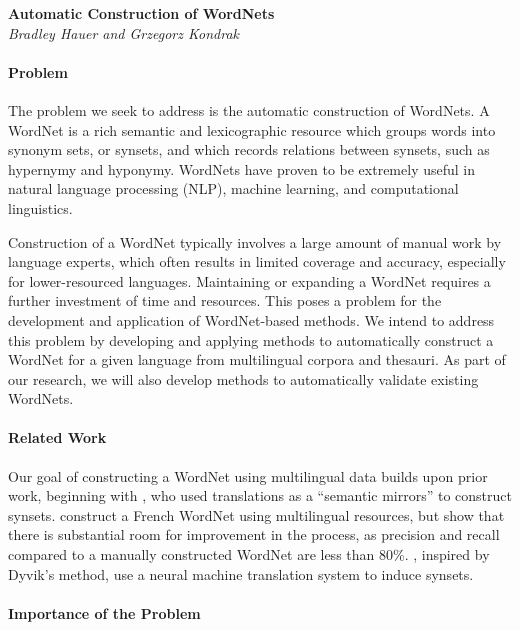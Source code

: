 \documentclass[12pt]{article}
\begin{document}
\begin{center}
{\bf \Large Automatic Construction of WordNets}  \\
\vspace{.1in}
{\em Bradley Hauer and Grzegorz Kondrak}
\end{center}


\paragraph{Problem}

The problem we seek to address is the automatic construction of WordNets. 
A WordNet is a rich semantic and lexicographic resource 
which groups words into synonym sets, or synsets, 
and which records relations between synsets, such as hypernymy and hyponymy. 
WordNets have proven to be extremely useful 
in natural language processing (NLP), machine learning, 
and computational linguistics.

Construction of a WordNet typically involves 
a large amount of manual work by language experts, 
which often results in limited coverage and accuracy, 
especially for lower-resourced languages. 
Maintaining or expanding a WordNet 
requires a further investment of time and resources. 
This poses a problem 
for the development and application of WordNet-based methods. 
We intend to address this problem by developing and applying methods 
to automatically construct a WordNet 
for a given language from multilingual corpora and thesauri.
As part of our research, 
we will also develop methods to automatically validate existing WordNets.


\paragraph{Related Work}

Our goal of constructing a WordNet using multilingual data
builds upon prior work, beginning with \cite{dyvik2004},
who used translations as a ``semantic mirrors'' to construct synsets.
\cite{sagot2008} construct a French WordNet
using multilingual resources,
but show that there is substantial room for improvement 
in the process, as precision and recall compared to a manually constructed
WordNet are less than 80\%.
\cite{lohk2018}, inspired by Dyvik's method,
use a neural machine translation system to induce synsets.


\paragraph{Importance of the Problem}
\end{document}

